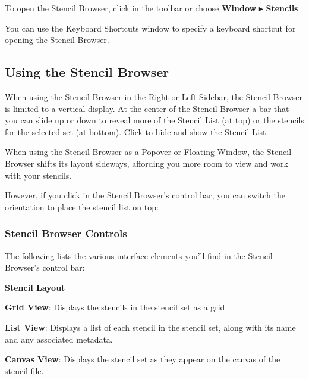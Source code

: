 \documentclass[../main.tex]{subfiles}
\begin{document}
To open the Stencil Browser, click  in the
toolbar or choose \textbf{Window} $\blacktriangleright$ \textbf{Stencils}.

\begin{ogtip}
  You can use the Keyboard Shortcuts window to specify a keyboard shortcut for opening the Stencil
  Browser.
\end{ogtip}

\subsection{Using the Stencil Browser}

When using the Stencil Browser in the Right or Left Sidebar, the Stencil Browser is limited to a
vertical display. At the center of the Stencil Browser a bar that you can slide up or down to
reveal more of the Stencil List (at top) or the stencils for the selected set (at bottom).
Click  to hide and show the Stencil List.


When using the Stencil Browser as a Popover or Floating Window, the Stencil Browser shifts its
layout sideways, affording you more room to view and work with your stencils.


However, if you click  in the Stencil
Browser's control bar, you can switch the orientation to place the stencil list on top:


\subsubsection{Stencil Browser Controls}

The following lists the various interface elements you'll find in the Stencil Browser's control
bar:

\textbf{Stencil Layout}

\begin{description}[style=nextline]
  \item[{\ogicon{12.5pt}{res/og7_button_stencils_gridview.png}}] \textbf{Grid View}: Displays
    the stencils in the stencil set as a grid.
  \item[{\ogicon{12.5pt}{res/og7_button_stencils_listview.png}}] \textbf{List View}: Displays a
    list of each stencil in the stencil set, along with its name and any associated metadata.
  \item[{\ogicon{12.5pt}{res/og7_button_stencils_stencilsetview.png}}] \textbf{Canvas View}:
    Displays the stencil set as they appear on the canvas of the stencil file.
\end{description}
\end{document}

